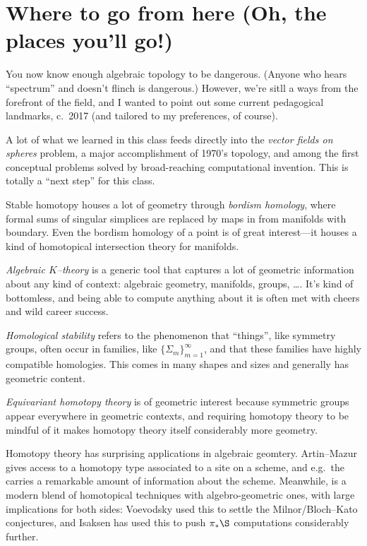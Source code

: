 
\section{Where to go from here (Oh, the places you'll go!)}

You now know enough algebraic topology to be dangerous.  (Anyone who hears ``spectrum'' and doesn't flinch is dangerous.)  However, we're sitll a ways from the forefront of the field, and I wanted to point out some current pedagogical landmarks, c.\ 2017 (and tailored to my preferences, of course).

A lot of what we learned in this class feeds directly into the \textit{vector fields on spheres} problem, a major accomplishment of 1970's topology, and among the first conceptual problems solved by broad-reaching computational invention.  This is totally a ``next step'' for this class.

Stable homotopy houses a lot of geometry through \textit{bordism homology}, where formal sums of singular simplices are replaced by maps in from manifolds with boundary.  Even the bordism homology of a point is of great interest---it houses a kind of homotopical intersection theory for manifolds.

\textit{Algebraic $K$--theory} is a generic tool that captures a lot of geometric information about any kind of context: algebraic geometry, manifolds, groups, \ldots. It's kind of bottomless, and being able to compute anything about it is often met with cheers and wild career success.

\textit{Homological stability} refers to the phenomenon that ``things'', like symmetry groups, often occur in families, like $\{\Sigma_m\}_{m=1}^\infty$, and that these families have highly compatible homologies.  This comes in many shapes and sizes and generally has geometric content.

\textit{Equivariant homotopy theory} is of geometric interest because symmetric groups appear everywhere in geometric contexts, and requiring homotopy theory to be mindful of it makes homotopy theory itself considerably more geometry.

Homotopy theory has surprising applications in algebraic geomtery.  Artin--Mazur gives access to a homotopy type associated to a site on a scheme, and e.g.\ the  carries a remarkable amount of information about the scheme.  Meanwhile,  is a modern blend of homotopical techniques with algebro-geometric ones, with large implications for both sides: Voevodsky used this to settle the Milnor/Bloch--Kato conjectures, and Isaksen has used this to push $\pi_* \S$ computations considerably further.


